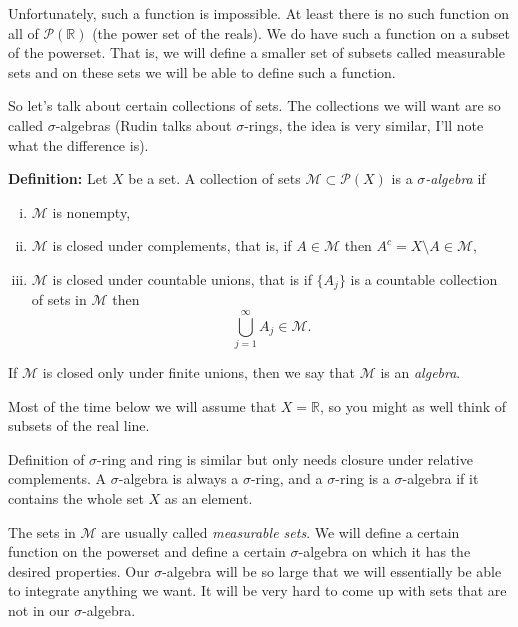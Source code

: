 \documentclass[12pt]{book}
\newcommand{\R}{{\mathbb{R}}}
\newcommand{\sM}{{\mathcal{M}}}
\newcommand{\sP}{{\mathcal{P}}}
\theoremstyle{plain}
\theoremstyle{remark}
\theoremstyle{definition}
\theoremstyle{exercise}
\theoremstyle{example}
\begin{document}
Unfortunately, such a function is impossible.  At least there is
no such function on all of $\sP(\R)$ (the power set of the reals).
We do have such a function on a subset of the powerset.  That is,
we will define a smaller set of subsets called measurable sets
and on these sets we will be able to define such a function.

So let's talk about certain collections of sets.  The collections we will
want are so called $\sigma$-algebras (Rudin talks about $\sigma$-rings, the
idea is very similar, I'll note what the difference is).

\medskip

\textbf{Definition:}
Let $X$ be a set.
A collection of sets $\sM \subset \sP(X)$ is a \emph{$\sigma$-algebra} if
\begin{enumerate}[(i)]
\item $\sM$ is nonempty,
\item $\sM$ is closed under complements, that is, if $A \in \sM$ then
$A^c = X \setminus A \in \sM$,
\item $\sM$ is closed under countable unions, that is if $\{ A_j \}$ is
a countable collection of sets in $\sM$ then
$$
\bigcup_{j=1}^\infty A_j \in \sM .
$$
\end{enumerate}
If $\sM$ is closed only under finite unions, then we say that $\sM$ is an
\emph{algebra}.

\medskip

Most of the time below we will assume that $X=\R$, so you might as well
think of subsets of the real line.

\medskip

Definition of $\sigma$-ring and ring is similar but only needs closure under
relative complements.  A $\sigma$-algebra is always a $\sigma$-ring, and a
$\sigma$-ring is a $\sigma$-algebra if it contains the whole
set $X$ as an element.

The sets in $\sM$ are usually called \emph{measurable sets}.  We will define a
certain function on the powerset and define a certain
$\sigma$-algebra on which it has the desired properties.  Our
$\sigma$-algebra will be so large that we will essentially be able to
integrate anything we want.  It will be very hard to come up with sets that
are not in our $\sigma$-algebra.

\medskip
\end{document}

